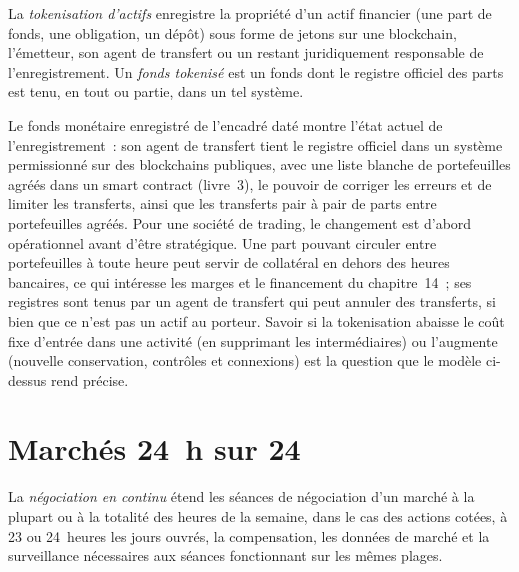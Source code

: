 \begin{definition}\label{def:fm:competition-and-the-future:token}
La \emph{tokenisation d'actifs} enregistre la propriété d'un actif financier (une part de fonds, une obligation, un dépôt) sous forme de jetons sur une
blockchain, l'émetteur, son agent de transfert ou un  restant juridiquement responsable de l'enregistrement. Un
\emph{fonds tokenisé} est un fonds dont le registre officiel des parts est tenu, en tout ou partie, dans un tel système.
\end{definition}

Le fonds monétaire enregistré de l'encadré daté montre l'état actuel de l'enregistrement~: son agent de transfert tient le registre officiel dans un
système permissionné sur des blockchains publiques, avec une liste blanche de portefeuilles agréés dans un smart contract (livre~3), le pouvoir de corriger les erreurs et de limiter
les transferts, ainsi que les transferts pair à pair de parts entre portefeuilles agréés. Pour une société de trading, le changement est d'abord opérationnel avant d'être stratégique. Une
part pouvant circuler entre portefeuilles à toute heure peut servir de collatéral en dehors des heures bancaires, ce qui intéresse les marges et le financement du chapitre~14~; ses
registres sont tenus par un agent de transfert qui peut annuler des transferts, si bien que ce n'est pas un actif au porteur. Savoir si la tokenisation abaisse le coût fixe d'entrée dans une
activité (en supprimant les intermédiaires) ou l'augmente (nouvelle conservation, contrôles et connexions) est la question que le modèle ci-dessus rend précise.

\section{Marchés 24~h sur 24}

\begin{definition}\label{def:fm:competition-and-the-future:rtc}
La \emph{négociation en continu} étend les séances de négociation d'un marché à la plupart ou à la totalité des heures de la semaine, dans le cas des actions cotées,
à 23 ou 24~heures les jours ouvrés, la compensation, les données de marché et la surveillance nécessaires aux séances fonctionnant sur les mêmes plages.
\end{definition}

